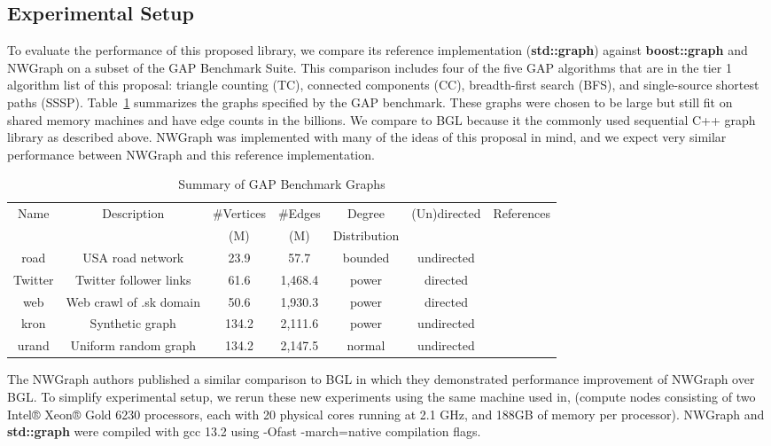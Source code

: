 \subsection{Experimental Setup}
To evaluate the performance of this proposed library, we compare its reference implementation
(\textbf{std::graph}) against \textbf{boost::graph} and NWGraph on a subset of the GAP Benchmark Suite\cite{gapbs_2023}.
This comparison includes four of the five GAP algorithms that are in the tier 1 algorithm list of this proposal:
triangle counting (TC), connected components (CC), breadth-first search (BFS),
and single-source shortest paths (SSSP).
Table~\ref{tab:gap_graphs} summarizes the graphs specified by the GAP benchmark.
These graphs were chosen to be large but still fit on shared memory machines and have edge counts in the billions.
We compare to BGL because it the commonly used sequential C++ graph library as described above.
NWGraph was implemented with many of the ideas of this proposal in mind, and we expect very similar performance
between NWGraph and this reference implementation.

\begin{table}[h!]
\centering
\begin{tabular}{c c c c c c c}
Name & Description & \#Vertices & \#Edges & Degree & (Un)directed & References \\
     &             & (M)        & (M)     & Distribution & & \\\hline
road & USA road network & 23.9 & 57.7 & bounded & undirected & \cite{dimacs9th}\\\hline
Twitter & Twitter follower links & 61.6 & 1,468.4 & power & directed & \cite{Twitter}\\\hline
web & Web crawl of .sk domain & 50.6 & 1,930.3 & power & directed & \cite{LAW1}\\\hline
kron & Synthetic graph & 134.2 & 2,111.6 & power & undirected & \cite{Graph500} \\\hline
urand & Uniform random graph & 134.2 & 2,147.5 & normal & undirected & \cite{Erdos}\\\hline
\end{tabular}
\caption{Summary of GAP Benchmark Graphs}
\label{tab:gap_graphs}
\end{table}

The NWGraph authors published a similar comparison to BGL\cite{REF_nwgraph_library} in which they
demonstrated performance improvement of NWGraph over BGL.
To simplify experimental setup, we rerun these new experiments using the same machine used in\cite{REF_nwgraph_library},
(compute nodes consisting of two Intel® Xeon® Gold 6230 processors, each with 20 physical cores running at 2.1 GHz,
and 188GB of memory per processor).
NWGraph and \textbf{std::graph} were compiled with gcc 13.2 using -Ofast -march=native compilation flags.

